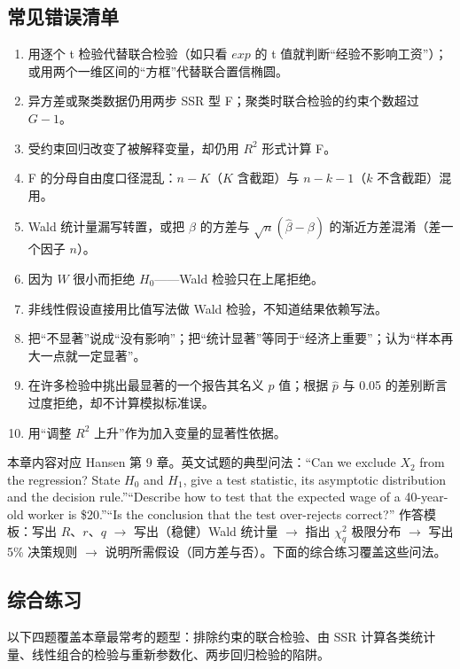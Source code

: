\subsection{常见错误清单}

\begin{enumerate}
  \item 用逐个 t 检验代替联合检验（如只看 $exp$ 的 t 值就判断“经验不影响工资”）；或用两个一维区间的“方框”代替联合置信椭圆。
  \item 异方差或聚类数据仍用两步 SSR 型 F；聚类时联合检验的约束个数超过 $G-1$。
  \item 受约束回归改变了被解释变量，却仍用 $R^2$ 形式计算 F。
  \item F 的分母自由度口径混乱：$n-K$（$K$ 含截距）与 $n-k-1$（$k$ 不含截距）混用。
  \item Wald 统计量漏写转置，或把 $\hat\beta$ 的方差与 $\sqrt n(\hat\beta-\beta)$ 的渐近方差混淆（差一个因子 $n$）。
  \item 因为 $W$ 很小而拒绝 $H_0$——Wald 检验只在上尾拒绝。
  \item 非线性假设直接用比值写法做 Wald 检验，不知道结果依赖写法。
  \item 把“不显著”说成“没有影响”；把“统计显著”等同于“经济上重要”；认为“样本再大一点就一定显著”。
  \item 在许多检验中挑出最显著的一个报告其名义 $p$ 值；根据 $\hat p$ 与 0.05 的差别断言过度拒绝，却不计算模拟标准误。
  \item 用“调整 $R^2$ 上升”作为加入变量的显著性依据。
\end{enumerate}

\begin{keypt}[英文试卷常见问法]
本章内容对应 Hansen 第 9 章。英文试题的典型问法：“Can we exclude $X_2$ from the regression? State $H_0$ and $H_1$, give a test statistic, its asymptotic distribution and the decision rule.”“Describe how to test that the expected wage of a 40-year-old worker is \$20.”“Is the conclusion that the test over-rejects correct?” 作答模板：写出 $R$、$r$、$q$ $\to$ 写出（稳健）Wald 统计量 $\to$ 指出 $\chi^2_q$ 极限分布 $\to$ 写出 5\% 决策规则 $\to$ 说明所需假设（同方差与否）。下面的综合练习覆盖这些问法。
\end{keypt}

\subsection{综合练习}

以下四题覆盖本章最常考的题型：排除约束的联合检验、由 SSR 计算各类统计量、线性组合的检验与重新参数化、两步回归检验的陷阱。

